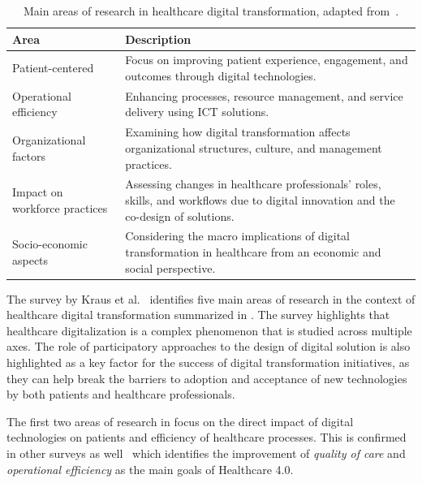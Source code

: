 \begin{table}[t]
    \centering
    \renewcommand{\arraystretch}{1.2}
    \begin{tabularx}{\textwidth}{>{\raggedright\arraybackslash}p{}|>{\raggedright\arraybackslash}X}
        \toprule
        \textbf{Area} & \textbf{Description} \\
        \midrule
        Patient-centered & Focus on improving patient experience, engagement, and outcomes through digital technologies. \\
        \hline
        Operational efficiency & Enhancing processes, resource management, and service delivery using ICT solutions. \\
        \hline
        Organizational factors & Examining how digital transformation affects organizational structures, culture, and management practices. \\
        \hline
        Impact on workforce practices & Assessing changes in healthcare professionals' roles, skills, and workflows due to digital innovation and the co-design of solutions. \\
        \hline
        Socio-economic aspects & Considering the macro implications of digital transformation in healthcare from an economic and social perspective. \\
        \bottomrule
    \end{tabularx}
    \caption{Main areas of research in healthcare digital transformation, adapted from~\cite{Kraus_Schiavone_Pluzhnikova_Invernizzi_2021}.}
    \label{tab:h40-clusters}
\end{table}


The survey by Kraus et al.~\cite{Kraus_Schiavone_Pluzhnikova_Invernizzi_2021} identifies five main areas of research in the context of healthcare digital transformation summarized in .
%
The survey highlights that healthcare digitalization is a complex phenomenon that is studied across multiple axes.
%
The role of participatory approaches to the design of digital solution is also highlighted as a key factor for the success of digital transformation initiatives, as they can help break the barriers to adoption and acceptance of new technologies by both patients and healthcare professionals.

The first two areas of research in  focus on the direct impact of digital technologies on patients and efficiency of healthcare processes.
%
This is confirmed in other surveys as well~\cite{Al-Jaroodi_Mohamed_Abukhousa_2020,Tortorella_Fogliatto_Mac_Cawley_Vergara_Vassolo_Sawhney_2020} which identifies the improvement of \emph{quality of care} and \emph{operational efficiency} as the main goals of Healthcare 4.0. 


